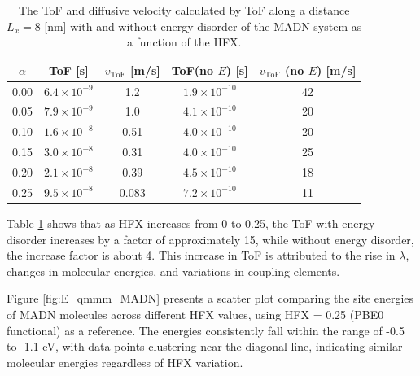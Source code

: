 \documentclass[letterpaper,12pt]{article}
\begin{document}
\begin{table}[H]
    \centering
    \begin{tabular}{c c c c c}
    \hline
        $\alpha$ & ToF [s] & $v_\text{ToF}$ [m/s] & ToF(no $E$) [s] & $v_\text{ToF}$ (no $E$) [m/s] \\
    \hline
        0.00 &  $6.4 \times 10^{-9}$ & 1.2 & $1.9 \times 10^{-10}$ & 42 \\
        0.05 & $ 7.9 \times 10^{-9}$ & 1.0 & $4.1 \times 10^{-10}$ & 20 \\
        0.10 & $ 1.6 \times 10^{-8}$ & 0.51 & $4.0 \times 10^{-10} $ & 20 \\
        0.15 & $ 3.0 \times 10^{-8}$ & 0.31 & $4.0 \times 10^{-10} $ & 25 \\
        0.20 & $ 2.1 \times 10^{-8}$ & 0.39 & $4.5 \times 10^{-10}$ & 18 \\
        0.25 & $ 9.5 \times 10^{-8}$ & 0.083 & $7.2 \times 10^{-10}$ & 11 \\
    \hline
    \end{tabular}
    \caption{The ToF and diffusive velocity calculated by ToF along a distance $L_x = 8$ [nm] with and without energy disorder of the MADN system as a function of the HFX. }
    \label{tab:ToF_MADN_HFX}
\end{table}

Table \ref{tab:ToF_MADN_HFX} shows that as HFX increases from 0 to 0.25, the ToF with energy disorder increases by a factor of approximately 15, while without energy disorder, the increase factor is about 4. This increase in ToF is attributed to the rise in $\lambda$, changes in molecular energies, and variations in coupling elements.

Figure \ref{fig:E_qmmm_MADN} presents a scatter plot comparing the site energies of MADN molecules across different HFX values, using HFX = 0.25 (PBE0 functional) as a reference. The energies consistently fall within the range of -0.5 to -1.1 eV, with data points clustering near the diagonal line, indicating similar molecular energies regardless of HFX variation.
\end{document}
